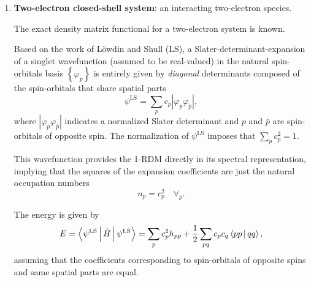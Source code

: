 \begin{enumerate}
    \item \textbf{Two-electron closed-shell system}: an interacting two-electron
        species.

        The exact density matrix functional for a two-electron system is
        known.

        Based on the work of Löwdin and Shull (LS),
        a Slater-determinant-expansion of a singlet wavefunction (assumed to be
        real-valued) in the natural spin-orbitals basis $\left\{ \varphi_p \right\}$ 
        is entirely given by \textit{diagonal} determinants composed of the
        spin-orbitals that share spatial parts 
        \begin{equation}
            \psi^{\text{LS}} =
            \sum_{p} c_p \left| \varphi_p \varphi_{\bar{p}} \right|
            ,
        \end{equation}
        where $\left| \varphi_p \varphi_{\bar{p}} \right|$ indicates a 
        normalized Slater determinant and $p$ and $\bar{p}$ are
        spin-orbitals of opposite spin.
        The normalization of $\psi^{\text{LS}}$ imposes
        that $\displaystyle\sum_{p} c_p^{2} = 1$.

        This wavefunction provides the 1-RDM directly in its spectral 
        representation, implying that the squares of the expansion 
        coefficients are just the natural occupation numbers
        \begin{equation}
            n_p = c_p^2\quad \forall_p
            .
        \end{equation}

        The energy is given by 
        \begin{equation}
            E = \Braket{\psi^{\text{LS}} | \hat{H} | \psi^{\text{LS}}} =
            \sum_{p} c_p^2 h_{pp} + \frac{1}{2} \sum_{pq} 
            c_p c_q \Braket{pp | qq}
            ,
        \end{equation}
        assuming that the coefficients corresponding to spin-orbitals of opposite
        spins and same spatial parts are equal.


\end{enumerate}
